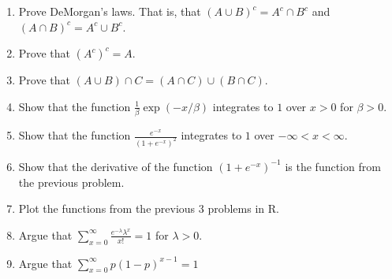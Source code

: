 \documentclass[12pt]{article}
\begin{document}
\begin{enumerate}[1.]
\item Prove DeMorgan's laws. That is, that $(A \cup B ) ^c = A^c \cap B^c$ and $(A \cap B) ^ c = A^c \cup B^c$.
\item Prove that $(A^c)^c = A$.
\item Prove that $(A \cup B) \cap C = (A\cap C) \cup (B\cap C)$.
\item Show that the function $\frac{1}{\beta} \exp(-x / \beta)$ integrates to $1$ over $x > 0$ for $\beta > 0$.
\item Show that the function $\frac{e^{-x}}{\left(1+  e^{-x} \right)^2}$ integrates to $1$ over $-\infty < x < \infty$.
\item Show that the derivative of the function $(1 + e^{-x})^{-1}$ is the function from the previous problem.
\item Plot the functions from the previous 3 problems in R.
\item Argue that $\sum_{x=0}^\infty \frac{e^{-\lambda}\lambda^x}{x!} = 1$ for $\lambda > 0$.
\item Argue that $\sum_{x=0}^\infty p(1 - p)^{x-1} = 1$ 
\end{enumerate}
\end{document}
